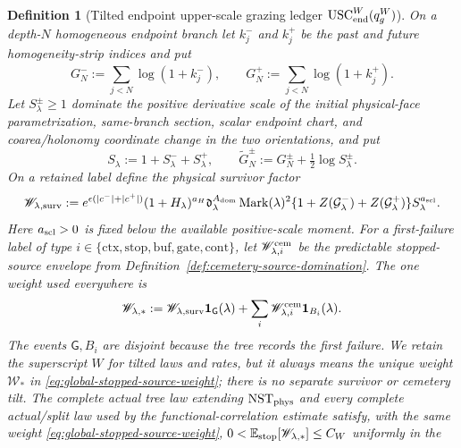 \documentclass[11pt]{article}
\newtheorem{definition}[theorem]{Definition}
\newcommand{\one}{\mathbf 1}
\begin{document}
\begin{definition}[Tilted endpoint upper-scale grazing ledger
$\mathrm{USC}_{\rm end}^{W}(q_g^W)$]
\label{def:endpoint-upper-scale}
On a depth-$N$ homogeneous endpoint branch let $k_j^-$ and $k_j^+$ be the
past and future homogeneity-strip indices and put
\begin{equation}
\label{eq:homogeneity-log-marks}
 G_N^-:=\sum_{j<N}\log(1+k_j^-),\qquad
 G_N^+:=\sum_{j<N}\log(1+k_j^+).
\end{equation}
Let $S_\lambda^\pm\ge1$ dominate the positive derivative scale of the initial
physical-face parametrization, same-branch section, scalar endpoint chart,
and coarea/holonomy coordinate change in the two orientations, and put
\begin{equation}
\label{eq:augmented-homogeneity-mark}
 S_\lambda:=1+S_\lambda^-+S_\lambda^+,
 \qquad
 \widetilde G_N^\pm:=G_N^\pm+\tfrac12\log S_\lambda^\pm.
\end{equation}
On a retained label define the physical survivor factor
\begin{equation}
\label{eq:global-event-weight}
 \mathscr W_{\lambda,\rm surv}:=
 e^{\epsilon(|c^-|+|c^+|)}(1+H_\lambda)^{a_H}
 \mathfrak d_\lambda^{A_{\rm dom}}
 \operatorname{Mark}(\lambda)^2
 \{1+Z(\mathcal G_\lambda^-)+Z(\mathcal G_\lambda^+)\}
 S_\lambda^{a_{\rm scl}}.
\end{equation}
Here $a_{\rm scl}>0$ is fixed below the available positive-scale moment.
For a first-failure label of type
$i\in\{\mathrm{ctx},\mathrm{stop},\mathrm{buf},\mathrm{gate},
\mathrm{cont}\}$, let $\mathscr W_{\lambda,i}^{\rm cem}$ be the predictable
stopped-source envelope from Definition~\ref{def:cemetery-source-domination}.
The one weight used everywhere is
\begin{equation}
\label{eq:global-stopped-source-weight}
 \mathscr W_{\lambda,*}:=
 \mathscr W_{\lambda,\rm surv}\one_{\mathsf G}(\lambda)
 +\sum_i\mathscr W_{\lambda,i}^{\rm cem}\one_{B_i}(\lambda).
\end{equation}
The events $\mathsf G,B_i$ are disjoint because the tree records the first
failure.  We retain the superscript $W$ for tilted laws and rates, but it
always means the unique weight $\mathscr W_*$ in
\eqref{eq:global-stopped-source-weight}; there is no separate survivor or
cemetery tilt.
The complete actual tree law extending $\mathrm{NST}_{\rm phys}$ and every
complete actual/split law used by the functional-correlation estimate
satisfy, with the
\emph{same} weight \eqref{eq:global-stopped-source-weight},
$0<\mathbb E_{\rm stop}[\mathscr W_{\lambda,*}]\le C_W$ uniformly in the

\end{definition}
\end{document}
